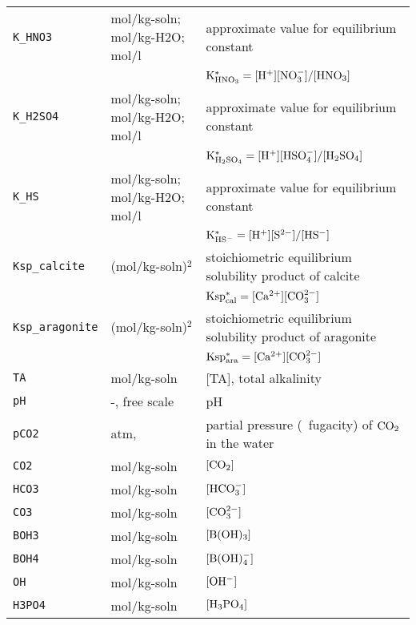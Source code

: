 \documentclass[article,nojss]{jss}
\begin{document}
\begin{footnotesize}
\begin{longtable}{l|l|p{7cm}}
\texttt{K\_HNO3}     &mol/kg-soln; mol/kg-H2O; mol/l   & approximate value for equilibrium constant \\
            &                                 & $\rm K^*_{HNO_3} = [H^+][NO_3^-] / [HNO_3]$\\              
\texttt{K\_H2SO4}    &mol/kg-soln; mol/kg-H2O; mol/l   & approximate value for equilibrium constant \\
            &                                 & $\rm K^*_{H_2SO_4} = [H^+][HSO_4^-] / [H_2SO_4]$\\    
\texttt{K\_HS}       & mol/kg-soln; mol/kg-H2O; mol/l  & approximate value for equilibrium constant \\
            &                                 & $\rm K^*_{HS^-} = [H^+][S^{2-}] / [HS^-]$\\
\texttt{Ksp\_calcite}& (mol/kg-soln)$^2$               & stoichiometric equilibrium solubility product of calcite\\
            &                                 & $\rm Ksp^*_{cal} = [Ca^{2+}][CO_3^{2-}]$\\
\texttt{Ksp\_aragonite} &(mol/kg-soln)$^2$             & stoichiometric equilibrium solubility product of aragonite\\
            &                                 & $\rm Ksp^*_{ara} = [Ca^{2+}][CO_3^{2-}]$\\
\texttt{TA}          & mol/kg-soln                     & [TA], total alkalinity\\
\texttt{pH}          & -, free scale                   & pH\\              
\texttt{pCO2}        & atm,                            & partial pressure (~fugacity) of $\rm CO_2$ in the water\\
\texttt{CO2}         & mol/kg-soln                     & $[\rm CO_2]$\\         
\texttt{HCO3}        & mol/kg-soln                     & $[\rm HCO_3^-]$\\         
\texttt{CO3}         & mol/kg-soln                     & $[\rm CO_3^{2-}]$\\         
\texttt{BOH3}        & mol/kg-soln                     & $[\rm B(OH)_3]$\\         
\texttt{BOH4}        & mol/kg-soln                     & $[\rm B(OH)_4^-]$\\                     
\texttt{OH}          & mol/kg-soln                     & $[\rm OH^-]$\\         
\texttt{H3PO4}       & mol/kg-soln                     & $[\rm H_3PO_4]$\\         

\end{longtable}
\end{footnotesize}
\end{document}

